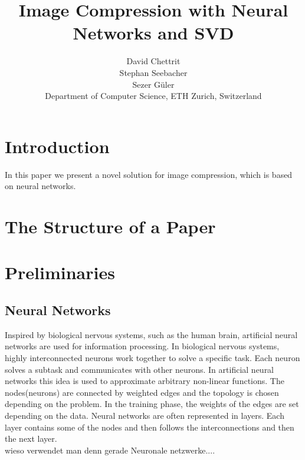 \documentclass[10pt,conference,compsocconf]{IEEEtran}
\begin{document}
\title{Image Compression with Neural Networks and SVD}

\author{
  David Chettrit\\
  Stephan Seebacher\\
  Sezer G\"uler\\
  Department of Computer Science, ETH Zurich, Switzerland
}




\maketitle

\begin{abstract}

\end{abstract}

\section{Introduction}

In this paper we present a novel solution for image compression, which is based on neural networks. 

\section{The Structure of a Paper}
\label{sec:structure-paper}



\section{Preliminaries}
\label{sec:tips-writing}

\subsection{Neural Networks}
Inspired by biological nervous systems, such as the human brain, artificial neural networks are used for information processing. In biological nervous systems, highly interconnected neurons work together to solve a specific task. Each neuron solves a subtask and communicates with other neurons. In artificial neural networks this idea is used to approximate arbitrary  non-linear functions. The nodes(neurons) are connected by weighted edges and the topology is chosen depending on the problem. In the training phase, the weights of the edges are set depending on the data. Neural networks are often represented in layers. Each layer contains some of the nodes and then follows the interconnections and then the next layer. 
\\
wieso verwendet man denn gerade Neuronale netzwerke....
\end{document}
